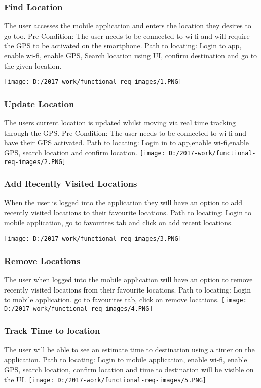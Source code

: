 \documentclass{article}
\begin{document}
\subsubsection{Find Location}
The user accesses the mobile application and enters the location they desires to go too. Pre-Condition: The user needs to be connected to wi-fi and will require the GPS to be activated on the smartphone. Path to locating: Login to app, enable wi-fi, enable GPS, Search location using UI, confirm destination and go to the given location.
\begin{center}
\texttt{[image: D:/2017-work/functional-req-images/1.PNG]}
\newpage
\subsubsection{Update Location}
The users current location is updated whilst moving via real time tracking through the GPS. Pre-Condition: The user needs to be connected to wi-fi and have their GPS activated. Path to locating: Login in to app,enable wi-fi,enable GPS, search location and confirm location.
\texttt{[image: D:/2017-work/functional-req-images/2.PNG]}
\newpage

\subsubsection{Add Recently Visited Locations}
When the user is logged into the application they will have an option to add recently visited locations to their favourite locations. Path to locating: Login to mobile application, go to favourites tab and click on add recent locations.


\texttt{[image: D:/2017-work/functional-req-images/3.PNG]}
\newpage
\subsubsection{Remove Locations}
The user when logged into the mobile application will have an option to remove recently visited locations from their favourite locations. Path to locating: Login to mobile application. go to favourites tab, click on remove locations.
\texttt{[image: D:/2017-work/functional-req-images/4.PNG]}
\newpage
\subsubsection{Track Time to location}
The user will be able to see an estimate time to destination using a timer on the application. Path to locating: Login to mobile application, enable wi-fi, enable GPS, search location, confirm location and time to destination will be visible on the UI. 
\texttt{[image: D:/2017-work/functional-req-images/5.PNG]}
\newpage


\end{center}
\end{document}
